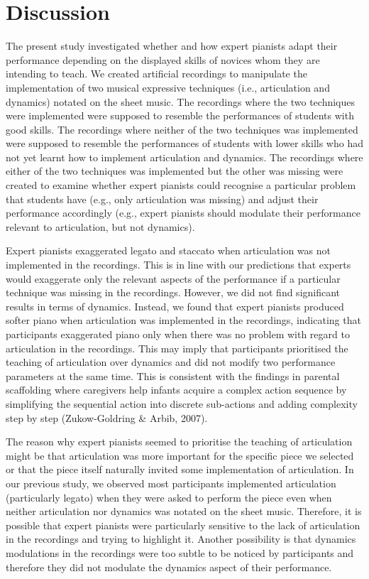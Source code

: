 \documentclass[
  man,floatsintext]{apa6}
\begin{document}
\clearpage

\hypertarget{discussion}{%
\section{Discussion}\label{discussion}}

The present study investigated whether and how expert pianists adapt their performance depending on the displayed skills of novices whom they are intending to teach. We created artificial recordings to manipulate the implementation of two musical expressive techniques (i.e., articulation and dynamics) notated on the sheet music. The recordings where the two techniques were implemented were supposed to resemble the performances of students with good skills. The recordings where neither of the two techniques was implemented were supposed to resemble the performances of students with lower skills who had not yet learnt how to implement articulation and dynamics. The recordings where either of the two techniques was implemented but the other was missing were created to examine whether expert pianists could recognise a particular problem that students have (e.g., only articulation was missing) and adjust their performance accordingly (e.g., expert pianists should modulate their performance relevant to articulation, but not dynamics).

Expert pianists exaggerated legato and staccato when articulation was not implemented in the recordings. This is in line with our predictions that experts would exaggerate only the relevant aspects of the performance if a particular technique was missing in the recordings. However, we did not find significant results in terms of dynamics. Instead, we found that expert pianists produced softer piano when articulation was implemented in the recordings, indicating that participants exaggerated piano only when there was no problem with regard to articulation in the recordings. This may imply that participants prioritised the teaching of articulation over dynamics and did not modify two performance parameters at the same time. This is consistent with the findings in parental scaffolding where caregivers help infants acquire a complex action sequence by simplifying the sequential action into discrete sub-actions and adding complexity step by step (Zukow-Goldring \& Arbib, 2007).

The reason why expert pianists seemed to prioritise the teaching of articulation might be that articulation was more important for the specific piece we selected or that the piece itself naturally invited some implementation of articulation. In our previous study, we observed most participants implemented articulation (particularly legato) when they were asked to perform the piece even when neither articulation nor dynamics was notated on the sheet music. Therefore, it is possible that expert pianists were particularly sensitive to the lack of articulation in the recordings and trying to highlight it. Another possibility is that dynamics modulations in the recordings were too subtle to be noticed by participants and therefore they did not modulate the dynamics aspect of their performance.
\end{document}
